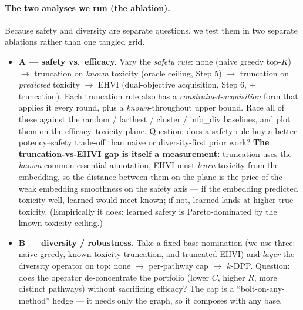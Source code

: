 \documentclass[11pt]{article}
\begin{document}
\paragraph{The two analyses we run (the ablation).} Because safety and diversity are
separate questions, we test them in two separate ablations rather than one tangled grid.
\begin{itemize}[leftmargin=2em,itemsep=1pt]
\item \textbf{A --- safety vs.\ efficacy.} Vary the \emph{safety rule}: none (naive greedy
top-$K$) $\to$ truncation on \emph{known} toxicity (oracle ceiling, Step 5) $\to$ truncation
on \emph{predicted} toxicity $\to$ EHVI (dual-objective acquisition, Step 6, $\pm$ truncation).
Each truncation rule also has a \emph{constrained-acquisition} form that applies it every
round, plus a \emph{known}-throughout upper bound. Race all of these against the
random / farthest / cluster / info\_div baselines, and plot them on the efficacy--toxicity
plane. Question: does a safety rule buy a better
potency--safety trade-off than naive or diversity-first prior work? \textbf{The
truncation-vs-EHVI gap is itself a measurement:} truncation uses the \emph{known}
common-essential annotation, EHVI must \emph{learn} toxicity from the embedding, so the
distance between them on the plane is the price of the weak embedding smoothness on the
safety axis --- if the embedding predicted toxicity well, learned would meet known; if not,
learned lands at higher true toxicity. (Empirically it does: learned safety is
Pareto-dominated by the known-toxicity ceiling.)
\item \textbf{B --- diversity / robustness.} Take a fixed base nomination (we use three:
naive greedy, known-toxicity truncation, and truncated-EHVI) and \emph{layer} the diversity
operator on top: none $\to$ per-pathway cap $\to$ $k$-DPP. Question: does the operator de-concentrate
the portfolio (lower $C$, higher $R$, more distinct pathways) without sacrificing efficacy?
The cap is a ``bolt-on-any-method'' hedge --- it needs only the graph, so it composes with
any base.
\end{itemize}
\end{document}
